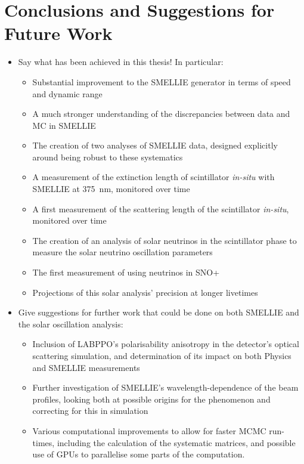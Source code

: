 \chapter{Conclusions and Suggestions for Future Work}\label{chap:conclusions}
{
    \color{blue}
\begin{itemize}
    \item Say what has been achieved in this thesis! In particular:
    \begin{itemize}
        \item Substantial improvement to the SMELLIE generator in terms of speed and dynamic range
        \item A much stronger understanding of the discrepancies between data and MC in SMELLIE
        \item The creation of two analyses of SMELLIE data, designed explicitly around being robust to these systematics
        \item A measurement of the extinction length of scintillator \textit{in-situ} with SMELLIE at \SI{375}{\nano\metre}, monitored over time
        \item A first measurement of the scattering length of the scintillator \textit{in-situ}, monitored over time
        \item The creation of an analysis of \beight{} solar neutrinos in the scintillator phase to measure the solar neutrino oscillation parameters
        \item The first measurement of \tonetwo{} using \beight{} neutrinos in SNO+
        \item Projections of this solar analysis' precision at longer livetimes
    \end{itemize}
    \item Give suggestions for further work that could be done on both SMELLIE and the solar oscillation analysis:
    \begin{itemize}
        \item Inclusion of LABPPO's polarisability anisotropy in the detector's optical scattering simulation, and determination of its impact on both Physics and SMELLIE measurements
        \item Further investigation of SMELLIE's wavelength-dependence of the beam profiles, looking both at possible origins for the phenomenon and correcting for this in simulation
        \item Various computational improvements to allow for faster MCMC run-times, including the calculation of the systematic matrices, and possible use of GPUs to parallelise some parts of the computation.

\end{itemize}
\end{itemize}}
